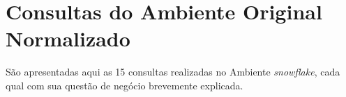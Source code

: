 
\chapter{Consultas do Ambiente Original Normalizado}
\label{queries_1}


São apresentadas aqui as 15 consultas realizadas no Ambiente \textit{snowflake}, cada qual com sua questão de negócio brevemente explicada.

\begin{enumerate}

    
    
	


	


\end{enumerate}
